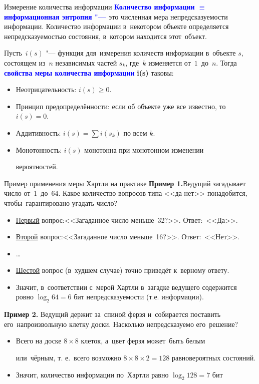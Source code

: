 \documentclass[aspectratio=169]{beamer}
\begin{document}
\begin{frame}{Измерение количества информации}
	\textbf{\textcolor{blue}{Количество информации $\equiv$ информационная энтропия "--- }}это численная мера непредсказуемости информации.
	Количество информации в~некотором объекте определяется непредсказуемостью состояния, в~котором находится этот~объект.

	\vspace{0.4cm}

	Пусть~$i (s)$ "--- функция для~измерения количеств информации в~объекте $s$, состоящем из~$n$
	независимых частей $s_k$, где~$k$ изменяется от~$1$~до~$n$. Тогда \textbf{\textcolor{blue}{свойства меры количества информации}}
	\textbf{i(s)} таковы:

	\begin{itemize}
		\item Неотрицательность: $i(s) \ge 0$.
		\item Принцип предопределённости: если об объекте уже все известно, то $i(s) = 0$.
		\item Аддитивность: $i(s) = \sum i(s_k)$ по всем $k$.
		\item Монотонность: $i(s)$ монотонна при монотонном изменении 
		
		вероятностей.
	\end{itemize}
\end{frame}

\begin{frame}{Пример применения меры Хартли на практике}
	\textbf{Пример 1.}Ведущий загадывает число от~1~до~64. Какое количество вопросов типа <<да-нет>> понадобится, чтобы~гарантировано угадать число?
	\begin{itemize}
		\item \underline{Первый} вопрос:<<Загаданное число меньше~32?>>. Ответ:~<<Да>>.
		\item \underline{Второй} вопрос:<<Загаданное число меньше~16?>>. Ответ:~<<Нет>>.
		\item \dots
		\item \underline{Шестой} вопрос (в~худшем случае) точно приведёт к~верному ответу.
		\item Значит, в~соответствии с~мерой Хартли в~загадке ведущего содержится ровно
		$\log_2 64 = 6$ бит непредсказуемости (т.е. информации).
	\end{itemize}

	\vspace{0.5cm}

	\textbf{Пример 2.} Ведущий держит за~спиной ферзя и~собирается поставить его~напроизвольную клетку доски. Насколько непредсказуемо его~решение?
	\begin{itemize}
		\item Всего на доске $8\times8$ клеток, а~цвет ферзя может~быть белым 

		или~чёрным, т. е.~всего возможно $8\times8\times2 = 128$ равновероятных состояний. 
		\item Значит, количество информации по~Хартли равно $\log_2 128 = 7$ бит
	\end{itemize}
\end{frame}
\end{document}
